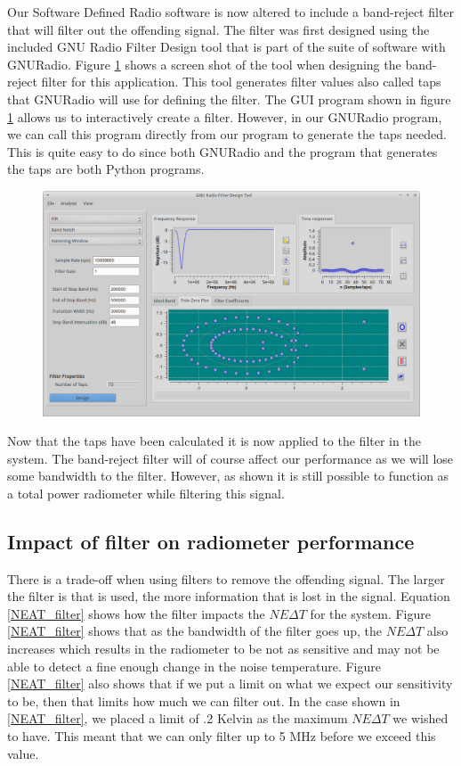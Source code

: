 Our Software Defined Radio software is now altered to include a band-reject filter that will filter out the offending signal.  The filter was first designed using the included GNU Radio Filter Design tool that is part of the suite of software with GNURadio.  Figure \ref{GRC_Filter_DSN} shows a screen shot of the tool when designing the band-reject filter for this application.  This tool generates filter values also called taps that GNURadio will use for defining the filter.  The GUI program shown in figure \ref{GRC_Filter_DSN} allows us to interactively create a filter.  However, in our GNURadio program, we can call this program directly from our program to generate the taps needed.  This is quite easy to do since both GNURadio and the program that generates the taps are both Python programs.  

\begin{figure}[h!tb] \centering

\includegraphics[width=\textwidth]{Images/GNURadio_Filter_dsn.png}
\label{GRC_Filter_DSN}
\end{figure}  

Now that the taps have been calculated it is now applied to the filter in the system.  The band-reject filter will of course affect our performance as we will lose some bandwidth to the filter.  However, as shown it is still possible to function as a total power radiometer while filtering this signal.  

\subsection{Impact of filter on radiometer performance}
There is a trade-off when using filters to remove the offending signal.  The larger the filter is that is used, the more information that is lost in the signal.  Equation \ref{NEAT_filter} shows how the filter impacts the $NE\Delta T$ for the system.  Figure \ref{NEAT_filter} shows that as the bandwidth of the filter goes up, the $NE\Delta T$ also increases which results in the radiometer to be not as sensitive and may not be able to detect a fine enough change in the noise temperature.  Figure \ref{NEAT_filter} also shows that if we put a limit on what we expect our sensitivity to be, then that limits how much we can filter out.  In the case shown in \ref{NEAT_filter}, we placed a limit of .2 Kelvin as the maximum $NE\Delta T$ we wished to have.  This meant that we can only filter up to 5 MHz before we exceed this value.

